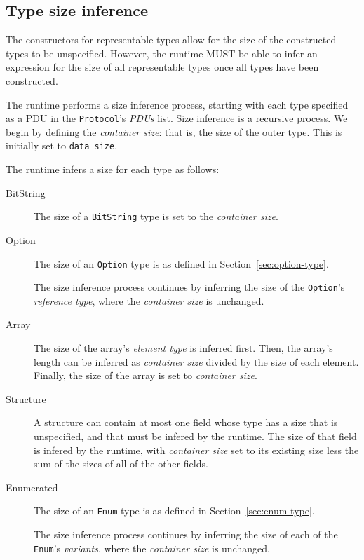 \documentclass[10pt,twocolumn,a4paper]{article}
\newcommand{\code}[1]{\texttt{#1}}
\begin{document}
\subsection{Type size inference}
\label{sec:runtime-size-inference}

The constructors for representable types allow for the size of the constructed
types to be unspecified. However, the runtime MUST be able to infer an
expression for the size of all representable types once all types have been
constructed.

The runtime performs a size inference process, starting with each type specified
as a PDU in the \code{Protocol}'s \emph{PDUs} list. Size inference is a
recursive process. We begin by defining the \emph{container size}: that is, the
size of the outer type. This is initially set to \code{data\_size}.

The runtime infers a size for each type as follows:
\begin{description}
  \item[BitString]
    The size of a \code{BitString} type is set to the \emph{container size}.
  \item[Option]
    The size of an \code{Option} type is as defined in
    Section~\ref{sec:option-type}.

    The size inference process continues by inferring the size of the
    \code{Option}'s \emph{reference type}, where the \emph{container size} is
    unchanged.
  \item[Array]
    The size of the array's \emph{element type} is inferred first. Then, the
    array's length can be inferred as \emph{container size} divided by the size
    of each element. Finally, the size of the array is set to
    \emph{container size}.
  \item[Structure]
    A structure can contain at most one field whose type has a size that is
    unspecified, and that must be infered by the runtime. The size of that
    field is infered by the runtime, with \emph{container size} set to its
    existing size less the sum of the sizes of all of the other fields.
  \item[Enumerated]
    The size of an \code{Enum} type is as defined in
    Section~\ref{sec:enum-type}.

    The size inference process continues by inferring the size of each of the
    \code{Enum}'s \emph{variants}, where the \emph{container size} is unchanged.
\end{description}
\end{document}
